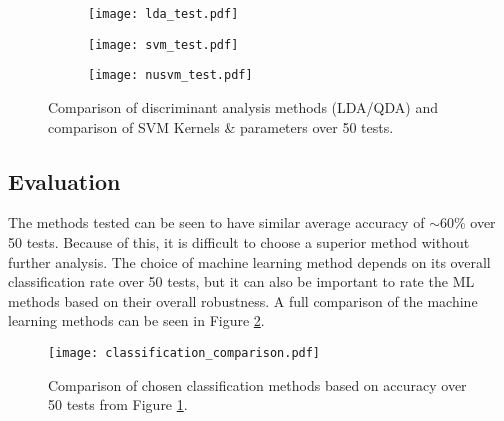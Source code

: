 \documentclass[../main.tex]{subfiles}
\begin{document}


\begin{figure}[H]
    \centering
    \begin{subfigure}[b]{1\textwidth}
        \centering
\texttt{[image: lda\_test.pdf]}
    \end{subfigure}
    \centering
    \begin{subfigure}[b]{1\textwidth}
        \centering
\texttt{[image: svm\_test.pdf]}
    \end{subfigure}
    \centering
    \begin{subfigure}[b]{1\textwidth}
        \centering
\texttt{[image: nusvm\_test.pdf]}
    \end{subfigure}
    \caption{ Comparison of discriminant analysis methods (\gls{LDA}/\gls{QDA}) and comparison of \gls{SVM} Kernels \& parameters over 50 tests.}

\label{fig:svm_test}
\end{figure}

\subsection{Evaluation}

The methods tested can be seen to have similar average accuracy of $\sim 60\%$ over 50 tests.
Because of this, it is difficult to choose a superior method without further analysis.
The choice of machine learning method depends on its overall classification rate over 50 tests, but it can also be important to rate the \gls{ML} methods based on their overall robustness.
A full comparison of the machine learning methods can be seen in Figure \ref{fig:classification_comparison}.

\begin{figure}[H]
\begin{center}
\texttt{[image: classification\_comparison.pdf]}
\caption{Comparison of chosen classification methods based on accuracy over 50 tests from Figure  \ref{fig:svm_test}.}
\label{fig:classification_comparison}
\end{center}
\end{figure}
\end{document}

